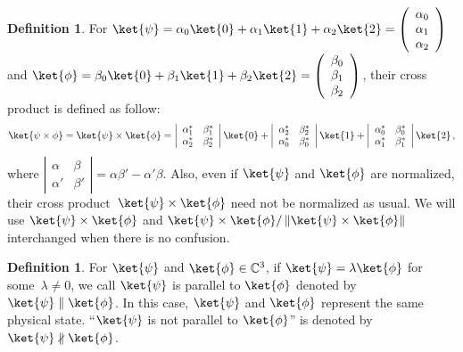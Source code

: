 \documentclass[12pt]{iopart}
\theoremstyle{plain}
\theoremstyle{definition}
\newtheorem{definition}[thm]{Definition}
\theoremstyle{remark}
\begin{document}
\begin{definition}\label{def:cross-product}For $\ket{\psi}=\alpha_{0}\ket{0}+\alpha_{1}\ket{1}+\alpha_{2}\ket{2}=\left(\begin{array}{c}
\alpha_{0}\\
\alpha_{1}\\
\alpha_{2}
\end{array}\right)$ and $\ket{\phi}=\beta_{0}\ket{0}+\beta_{1}\ket{1}+\beta_{2}\ket{2}=\left(\begin{array}{c}
\beta_{0}\\
\beta_{1}\\
\beta_{2}
\end{array}\right)$, their cross product is defined as follow: 
\begin{equation}
\ket{\psi\times\phi}=\ket{\psi}\times\ket{\phi}=\left|\begin{array}{cc}
\alpha_{1}^{*} & \beta_{1}^{*}\\
\alpha_{2}^{*} & \beta_{2}^{*}
\end{array}\right|\ket{0}+\left|\begin{array}{cc}
\alpha_{2}^{*} & \beta_{2}^{*}\\
\alpha_{0}^{*} & \beta_{0}^{*}
\end{array}\right|\ket{1}+\left|\begin{array}{cc}
\alpha_{0}^{*} & \beta_{0}^{*}\\
\alpha_{1}^{*} & \beta_{1}^{*}
\end{array}\right|\ket{2}\,,
\end{equation}
where $\left|\begin{array}{cc}
\alpha & \beta\\
\alpha' & \beta'
\end{array}\right|=\alpha\beta'-\alpha'\beta$. Also, even if $\ket{\psi}$ and $\ket{\phi}$ are normalized, their
cross product~$\ket{\psi}\times\ket{\phi}$ need not be normalized
as usual. We will use $\ket{\psi}\times\ket{\phi}$ and $\ket{\psi}\times\ket{\phi}/\left\Vert \ket{\psi}\times\ket{\phi}\right\Vert $
interchanged when there is no confusion.\end{definition}

\begin{definition}For $\ket{\psi}$ and $\ket{\phi}\in\mathbb{C}^{3}$,
if $\ket{\psi}=\lambda\ket{\phi}$ for some~$\lambda\ne0$, we call
$\ket{\psi}$ is parallel to $\ket{\phi}$ denoted by $\ket{\psi}\parallel\ket{\phi}$.
In this case, $\ket{\psi}$ and $\ket{\phi}$ represent the same physical
state. ``$\ket{\psi}$ is not parallel to $\ket{\phi}$'' is denoted
by $\ket{\psi}\nparallel\ket{\phi}$.\end{definition}
\end{document}
